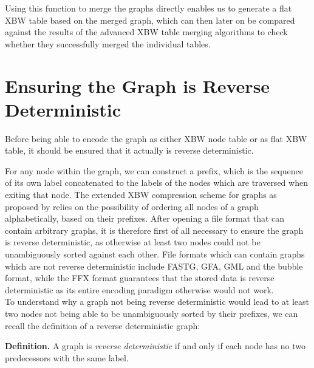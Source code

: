 \documentclass[a4paper,12pt,twoside,BCOR=10mm]{scrbook}
\begin{document}
Using this function to merge the graphs directly
enables us to generate a flat XBW table based on the merged graph,
which can then later on be compared against the results of the
advanced XBW table merging algorithms to check whether they successfully merged the individual tables.

\section{Ensuring the Graph is Reverse Deterministic}
\label{sec:why_rev_det}
%

Before being able to encode the graph as either XBW node table or as flat XBW table,
it should be ensured that it actually is reverse deterministic.

For any node within the graph, we can construct a prefix,
which is the sequence of its own label concatenated to the labels of the nodes which are
traversed when exiting that node.
The extended XBW compression scheme for graphs as proposed by \citet{Siren2014} relies
on the possibility of ordering all nodes of a graph alphabetically, based on their prefixes.
After opening a file format that can contain arbitrary graphs,
it is therefore first of all necessary to ensure the graph is reverse deterministic,
as otherwise at least two nodes could not be unambiguously sorted against each other.
File formats which can contain graphs which are not reverse deterministic include
FASTG, GFA, GML and the bubble format, while the FFX format guarantees that
the stored data is reverse deterministic as its entire encoding paradigm
otherwise would not work. \\
To understand why a graph not being reverse deterministic would lead to
at least two nodes not being able to be unambiguously sorted by their prefixes,
we can recall the definition of a reverse deterministic graph:

\textbf{Definition.} A graph is \textit{reverse deterministic} if and only if each node has no two predecessors with the same label.
\end{document}
